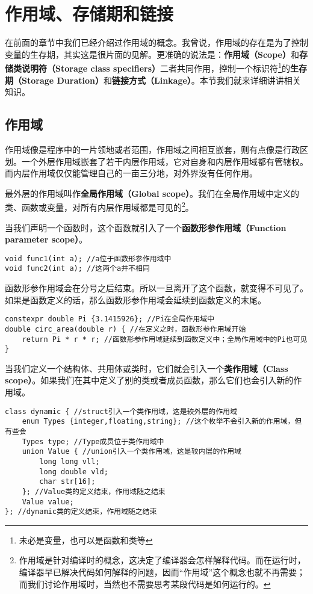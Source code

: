 \section{作用域、存储期和链接}
在前面的章节中我们已经介绍过作用域的概念。我曾说，作用域的存在是为了控制变量的生存期，其实这是很片面的见解。更准确的说法是：\textbf{作用域（Scope）}和\textbf{存储类说明符（Storage class specifiers）}二者共同作用，控制一个标识符\footnote{未必是变量，也可以是函数和类等}的\textbf{生存期（Storage Duration）}和\textbf{链接方式（Linkage）}。本节我们就来详细讲讲相关知识。\par
\subsection*{作用域}
作用域像是程序中的一片领地或者范围，作用域之间相互嵌套，则有点像是行政区划。一个外层作用域嵌套了若干内层作用域，它对自身和内层作用域都有管辖权。而内层作用域仅仅能管理自己的一亩三分地，对外界没有任何作用。\par
最外层的作用域叫作\textbf{全局作用域（Global scope）}。我们在全局作用域中定义的类、函数或变量，对所有内层作用域都是可见的\footnote{作用域是针对编译时的概念，这决定了编译器会怎样解释代码。而在运行时，编译器早已解决代码如何解释的问题，因而``作用域''这个概念也就不再需要；而我们讨论作用域时，当然也不需要思考某段代码是如何运行的。}。\par
当我们声明一个函数时，这个函数就引入了一个\textbf{函数形参作用域（Function parameter scope）}。
\begin{lstlisting}
void func1(int a); //a位于函数形参作用域中
void func2(int a); //这两个a并不相同
\end{lstlisting}
函数形参作用域会在分号之后结束。所以一旦离开了这个函数，\lstinline@a@ 就变得不可见了。如果是函数定义的话，那么函数形参作用域会延续到函数定义的末尾。
\begin{lstlisting}
constexpr double Pi {3.1415926}; //Pi在全局作用域中
double circ_area(double r) { //在定义之时，函数形参作用域开始
    return Pi * r * r; //函数形参作用域延续到函数定义中；全局作用域中的Pi也可见
}
\end{lstlisting}\par
当我们定义一个结构体、共用体或类时，它们就会引入一个\textbf{类作用域（Class scope）}。如果我们在其中定义了别的类或者成员函数，那么它们也会引入新的作用域。\par
\begin{lstlisting}
class dynamic { //struct引入一个类作用域，这是较外层的作用域
    enum Types {integer,floating,string}; //这个枚举不会引入新的作用域，但有些会
    Types type; //Type成员位于类作用域中
    union Value { //union引入一个类作用域，这是较内层的作用域
        long long vll;
        long double vld;
        char str[16];
    }; //Value类的定义结束，作用域随之结束
    Value value;
}; //dynamic类的定义结束，作用域随之结束
\end{lstlisting}
